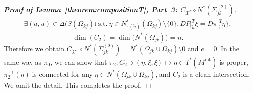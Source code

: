 \documentclass[a4paper,11pt,reqno]{amsart}
\numberwithin{equation}{section}
\theoremstyle{definition}
\theoremstyle{remark}
\begin{document}
\begin{proof}[{\bf Proof of Lemma~\ref{theorem:compositionT}, Part~3: $C_{\mathcal{X}^T}{\circ}N^\ast(\Sigma_{jk}^{(2)})$}]
\begin{align*}
  \exists (\tilde{u},u) \in \Delta\bigl(S(\Omega_{kj})\bigr)
  \ \text{s.t.}\ 
  \tilde{\eta} \in N^\ast_{\pi(\tilde{u})}(\Omega_{kj})\setminus\{0\},  
  DF\vert^T_{\tilde{u}}\tilde{\xi}=D\pi\vert^T_{\tilde{u}}\tilde{\eta}
  \bigr\},
\end{align*}
%
%
$$
\operatorname{dim}(C_2)
=
\operatorname{dim}\bigl(N^\ast(\Omega_{jk})\bigr)
=
n. 
$$
%
%
Therefore we obtain
%
%
$C_{\mathcal{X}^T}{\circ}N^\ast(\Sigma_{jk}^{(2)})=N^\ast(\Omega_{jk}\cup\Omega_{kj})\setminus0$ and $e=0$. 
In the same way as $\pi_0$, we can show that 
$\pi_2:C_2\ni(\eta,\xi,\xi)\mapsto\eta\in{T^\ast(M^\text{int})}$ is proper, 
$\pi_2^{-1}(\eta)$ is connected for any $\eta \in N^\ast(\Omega_{jk}\cup\Omega_{kj})$, 
and $C_2$ is a clean intersection. We omit the detail. This completes the proof. 
\end{proof}
%
%
\end{document}
